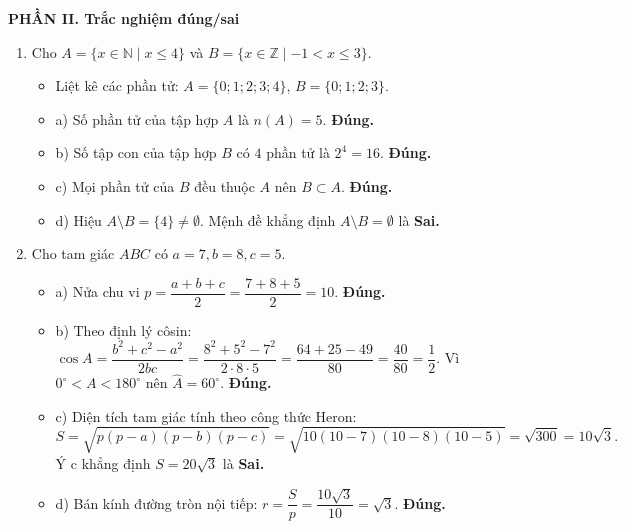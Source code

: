 \documentclass[12pt,a4paper]{article}
\begin{document}
\vspace{0.1cm}
\textbf{\large PHẦN II. Trắc nghiệm đúng/sai}
\begin{enumerate}
\item Cho $A = \{x \in \mathbb{N} \mid x \le 4\}$ và $B = \{x \in \mathbb{Z} \mid -1 < x \le 3\}$.
\begin{itemize}[leftmargin=0.5cm]
    \item Liệt kê các phần tử: $A = \{0; 1; 2; 3; 4\}$, $B = \{0; 1; 2; 3\}$.
    \item a) Số phần tử của tập hợp $A$ là $n(A) = 5$. \textbf{Đúng.}
    \item b) Số tập con của tập hợp $B$ có $4$ phần tử là $2^4 = 16$. \textbf{Đúng.}
    \item c) Mọi phần tử của $B$ đều thuộc $A$ nên $B \subset A$. \textbf{Đúng.}
    \item d) Hiệu $A \setminus B = \{4\} \ne \emptyset$. Mệnh đề khẳng định $A \setminus B = \emptyset$ là \textbf{Sai.}
\end{itemize}

\item Cho tam giác $ABC$ có $a = 7, b = 8, c = 5$.
\begin{itemize}[leftmargin=0.5cm]
    \item a) Nửa chu vi $p = \dfrac{a + b + c}{2} = \dfrac{7 + 8 + 5}{2} = 10$. \textbf{Đúng.}
    \item b) Theo định lý côsin: $\cos A = \dfrac{b^2 + c^2 - a^2}{2bc} = \dfrac{8^2 + 5^2 - 7^2}{2 \cdot 8 \cdot 5} = \dfrac{64 + 25 - 49}{80} = \dfrac{40}{80} = \dfrac{1}{2}$.
    Vì $0^\circ < A < 180^\circ$ nên $\widehat{A} = 60^\circ$. \textbf{Đúng.}
    \item c) Diện tích tam giác tính theo công thức Heron:
    \[
    S = \sqrt{p(p - a)(p - b)(p - c)} = \sqrt{10(10 - 7)(10 - 8)(10 - 5)} = \sqrt{300} = 10\sqrt{3}.
    \]
    Ý c khẳng định $S = 20\sqrt{3}$ là \textbf{Sai.}
    \item d) Bán kính đường tròn nội tiếp: $r = \dfrac{S}{p} = \dfrac{10\sqrt{3}}{10} = \sqrt{3}$. \textbf{Đúng.}
\end{itemize}
\end{enumerate}
\end{document}
